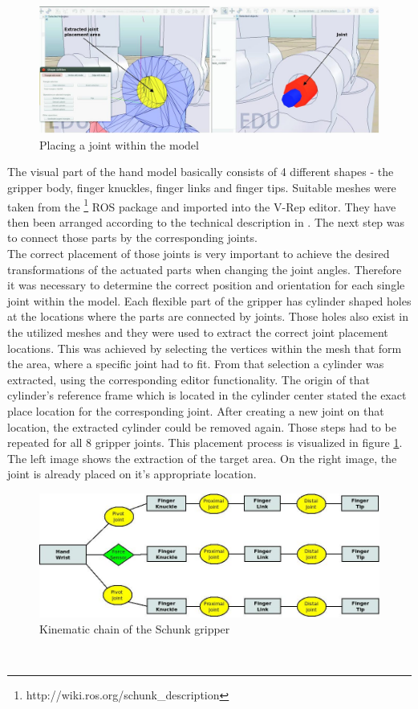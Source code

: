 \begin{figure}[t]
	\centering
  	\includegraphics[width=1.0\textwidth]{images/place_joint.jpg}
	\caption{Placing a joint within the model}
	\label{fig:place_jnt}
\end{figure}

The visual part of the hand model basically consists of 4 different shapes - the gripper body, finger knuckles, finger links and finger tips. Suitable meshes were taken from the \footnote{http://wiki.ros.org/schunk\_description} ROS package and imported into the V-Rep editor. They have then been arranged according to the technical description in \citep{schunk2010}. The next step was to connect those parts by the corresponding joints. \\

The correct placement of those joints is very important to achieve the desired transformations of the actuated parts when changing the joint angles. Therefore it was necessary to determine the correct position and orientation for each single joint within the model. Each flexible part of the gripper has cylinder shaped holes at the locations where the parts are connected by joints. Those holes also exist in the utilized meshes and they were used to extract the correct joint placement locations. This was achieved by selecting the vertices within the mesh that form the area, where a specific joint had to fit. From that selection a cylinder was extracted, using the corresponding editor functionality. The origin of that cylinder's reference frame which is located in the cylinder center stated the exact place location for the corresponding joint. After creating a new joint on that location, the extracted cylinder could be removed again. Those steps had to be repeated for all 8 gripper joints. This placement process is visualized in figure \ref{fig:place_jnt}. The left image shows the extraction of the target area. On the right image, the joint is already placed on it's appropriate location.
\begin{figure}[h]
	\centering
  	\includegraphics[width=1.0\textwidth]{images/hand_tree.jpg}
	\caption{Kinematic chain of the Schunk gripper}
	\label{fig:hand_tree}
\end{figure}\\

